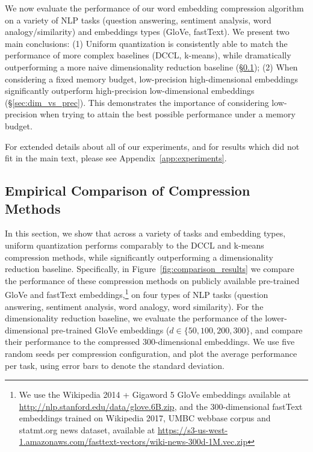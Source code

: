 We now evaluate the performance of our word embedding compression algorithm on a variety of NLP tasks (question answering, sentiment analysis, word analogy/similarity) and embeddings types (GloVe, fastText).
We present two main conclusions:
(1) Uniform quantization is consistently able to match the performance of more complex baselines (DCCL, k-means), while dramatically outperforming a more naive dimensionality reduction baseline (\S\ref{sec:exp_comparison});
(2) When considering a fixed memory budget, low-precision high-dimensional embeddings significantly outperform high-precision low-dimensional embeddings (\S\ref{sec:dim_vs_prec}).
This demonstrates the importance of considering low-precision when trying to attain the best possible performance under a memory budget.

For extended details about all of our experiments, and for results which did not fit in the main text, please see Appendix~\ref{app:experiments}.

\subsection{Empirical Comparison of Compression Methods}
\label{sec:exp_comparison}
In this section, we show that across a variety of tasks and embedding types, uniform quantization performs comparably to the DCCL and k-means compression methods, while significantly outperforming a dimensionality reduction baseline.
Specifically, in Figure~\ref{fig:comparison_results} we compare the performance of these compression methods on publicly available pre-trained GloVe and fastText embeddings,\footnote{We use the Wikipedia 2014 + Gigaword 5 GloVe embeddings available at \url{http://nlp.stanford.edu/data/glove.6B.zip}, and the 300-dimensional fastText embeddings trained on Wikipedia 2017, UMBC webbase corpus and statmt.org news dataset, available at \url{https://s3-us-west-1.amazonaws.com/fasttext-vectors/wiki-news-300d-1M.vec.zip}}
on four types of NLP tasks (question answering, sentiment analysis, word analogy, word similarity).
For the dimensionality reduction baseline, we evaluate the performance of the lower-dimensional pre-trained GloVe embeddings ($d\in\{50,100,200,300\}$, and compare their performance to the compressed 300-dimensional embeddings.
We use five random seeds per compression configuration, and plot the average performance per task, using error bars to denote the standard deviation.

